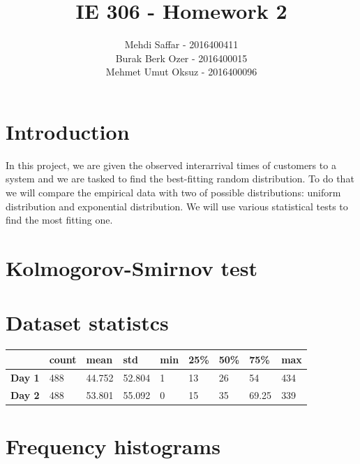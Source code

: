 \documentclass{article}
\title{IE 306 - Homework 2}
\author{Mehdi Saffar - 2016400411 \\ Burak Berk Ozer - 2016400015 \\ Mehmet Umut Oksuz - 2016400096}
\begin{document}
\maketitle

\section{Introduction}
In this project, we are given the observed interarrival times of customers to a
system and we are tasked to find the best-fitting random distribution. To do
that we will compare the empirical data with two of possible distributions:
uniform distribution and exponential distribution. We will use various
statistical tests to find the most fitting one.

\section{Kolmogorov-Smirnov test}

\section{Dataset statistcs}

\begin{table}[H]
    \centering
    \begin{tabular}{@{}lllllllll@{}}
        \toprule
                       & \textbf{count} & \textbf{mean} & \textbf{std} & \textbf{min} & \textbf{25\%} & \textbf{50\%} & \textbf{75\%} & \textbf{max} \\ \midrule
        \textbf{Day 1} & 488            & 44.752        & 52.804       & 1            & 13            & 26            & 54            & 434          \\
        \textbf{Day 2} & 488            & 53.801        & 55.092       & 0            & 15            & 35            & 69.25         & 339          \\ \bottomrule
    \end{tabular}
\end{table}


\section{Frequency histograms}
\end{document}
